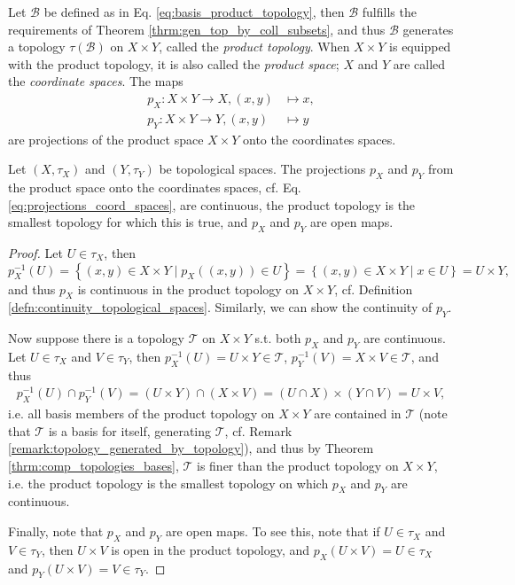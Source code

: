\begin{defn}\label{defn:product_topology}
	Let $\mathscr B$ be defined as in Eq. \ref{eq:basis_product_topology}, then $\mathscr B$ fulfills the requirements of Theorem \ref{thrm:gen_top_by_coll_subsets}, and thus $\mathscr B$ generates a topology $\tau(\mathscr B)$ on $X\times Y$, called the \textit{product topology}. When $X \times Y$ is equipped with the product topology, it is also called the \textit{product space}; $X$ and $Y$ are called the \textit{coordinate spaces}. The maps
	\begin{equation}
		\begin{aligned}
			p_X: X\times Y\to X, (x, y) &\mapsto x, \label{eq:projections_coord_spaces} 
			\\ p_Y: X\times Y\to Y, (x, y)&\mapsto y
		\end{aligned}
	\end{equation}
	are projections of the product space $X\times Y$ onto the coordinates spaces.
\end{defn}

\begin{theorem}\label{thrm:prod_top_continuous_projs}
	Let $(X, \tau_X)$ and $(Y, \tau_Y)$ be topological spaces. The projections $p_X$ and $p_Y$ from the product space onto the coordinates spaces, cf. Eq. \eqref{eq:projections_coord_spaces}, are continuous, the product topology is the smallest topology for which this is true, and $p_X$ and $p_Y$ are open maps.
\end{theorem}

\begin{proof}
	Let $U\in \tau_X$, then $$p_X^{-1}(U) = \left\{(x, y)\in X\times Y \mid p_X((x, y))\in U\right\} = \left\{(x, y)\in X\times Y \mid x\in U\right\} = U\times Y,$$ and thus $p_X$ is continuous in the product topology on $X\times Y$, cf. Definition \ref{defn:continuity_topological_spaces}. Similarly, we can show the continuity of $p_Y$.
	
	Now suppose there is a topology $\mathscr T$ on $X\times Y$ s.t. both $p_X$ and $p_Y$ are continuous. Let $U\in \tau_X$ and $V\in\tau_Y$, then $p_X^{-1}(U) = U\times Y\in \mathscr T$, $p_Y^{-1}(V) = X\times V\in \mathscr T$, and thus
	\begin{align}\label{eq:intersection_of_preimage_of_projs}
		p_X^{-1}(U) \cap p_Y^{-1}(V) = (U\times Y)\cap (X\times V) = (U\cap X) \times (Y\cap V) = U\times V,
	\end{align}
	i.e. all basis members of the product topology on $X\times Y$ are contained in $\mathscr T$ (note that $\mathscr T$ is a basis for itself, generating $\mathscr T$, cf. Remark \ref{remark:topology_generated_by_topology}), and thus by Theorem \ref{thrm:comp_topologies_bases}, $\mathscr T$ is finer than the product topology on $X\times Y$, i.e. the product topology is the smallest topology on which $p_X$ and $p_Y$ are continuous.
	
	Finally, note that $p_X$ and $p_Y$ are open maps. To see this, note that if $U\in\tau_X$ and $V\in\tau_Y$, then $U\times V$ is open in the product topology, and $p_X(U\times V) = U\in\tau_X$ and $p_Y(U\times V) = V\in\tau_Y$.
\end{proof}

